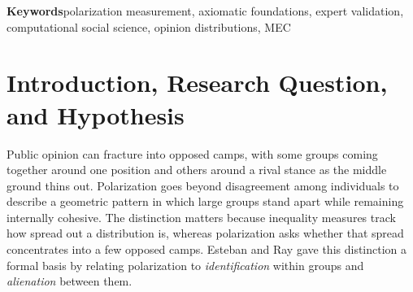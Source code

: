 \documentclass{article}
\theoremstyle{plain}
\theoremstyle{remark}
\begin{document}
\begin{abstract}
Measuring opinion polarization requires distinguishing the formation of opposed groups from dispersion alone. This thesis studies the \emph{Minimum Effort to Consensus} (MEC), a parametric family that interprets polarization as the minimum effort needed to bring an opinion distribution to a common position. The model applies to distributions with finite, nonempty support in $[0,1]$, with parameters $\alpha,\beta\geq1$ governing the influence of group size and distance from consensus. The analysis establishes existence of an optimal consensus point, uniqueness for $\beta>1$, and the identity with the minimum Earth Mover's Distance to consensus when $\alpha=\beta=1$. MEC satisfies the three original Esteban--Ray axioms for $\alpha>1$ and $\beta\geq1$, and a central-split monotonicity property for symmetric configurations. The theoretical results also distinguish the effects of moving a whole group and transferring part of it toward an extreme. A Python implementation supports comparisons on all five-point Likert histograms of $100$ agents, reduced to $2{,}299{,}726$ representatives under reflection, and on published expert ratings of $15$ hypothetical histograms. On the expert benchmark, $\mathrm{MEC}_{2,1.15}$ achieves Kendall's $\tau_B\approx0.886$, matching the concordance of $\mathrm{ER}_{0.8}$ and exceeding that of the Van der Eijk and Tastle--Wierman indices. This benchmark also informed parameter selection, so the comparison does not establish performance on unseen profiles. The results connect an interpretation of polarization as resistance to consensus with axiomatic guarantees and strong agreement with expert judgments on the evaluated profiles.
\end{abstract}

\medskip
\noindent\textbf{Keywords}\quad polarization measurement, axiomatic foundations, expert validation, computational social science, opinion distributions, MEC

\clearpage
\tableofcontents
\clearpage

\section{Introduction, Research Question, and Hypothesis}\label{sec:intro}

Public opinion can fracture into opposed camps, with some groups coming together around one position and others around a rival stance as the middle ground thins out. Polarization goes beyond disagreement among individuals to describe a geometric pattern in which large groups stand apart while remaining internally cohesive. The distinction matters because inequality measures track how spread out a distribution is, whereas polarization asks whether that spread concentrates into a few opposed camps. Esteban and Ray \citep{esteban1994measurement} gave this distinction a formal basis by relating polarization to \emph{identification} within groups and \emph{alienation} between them.
\end{document}

